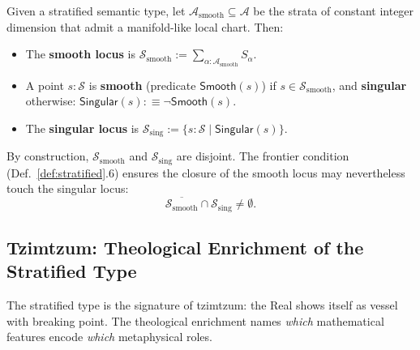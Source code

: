 \begin{definition}\label{def:smooth-sing}
Given a stratified semantic type, let $\mathcal{A}_{\mathrm{smooth}} \subseteq \mathcal{A}$ be the strata of constant integer dimension that admit a manifold-like local chart. Then:
\begin{itemize}
    \item The \textbf{smooth locus} is $\mathcal{S}_{\mathrm{smooth}} := \sum_{\alpha : \mathcal{A}_{\mathrm{smooth}}} S_\alpha$.
    \item A point $s : \mathcal{S}$ is \textbf{smooth} (predicate $\mathsf{Smooth}(s)$) if $s \in \mathcal{S}_{\mathrm{smooth}}$, and \textbf{singular} otherwise: $\mathsf{Singular}(s) :\equiv \neg \mathsf{Smooth}(s)$.
    \item The \textbf{singular locus} is $\mathcal{S}_{\mathrm{sing}} := \{ s : \mathcal{S} \mid \mathsf{Singular}(s) \}$.
\end{itemize}
By construction, $\mathcal{S}_{\mathrm{smooth}}$ and $\mathcal{S}_{\mathrm{sing}}$ are disjoint. The frontier condition (Def.~\ref{def:stratified}.6) ensures the closure of the smooth locus may nevertheless touch the singular locus:
\[
\overline{\mathcal{S}_{\mathrm{smooth}}} \cap \mathcal{S}_{\mathrm{sing}} \neq \emptyset.
\]
\end{definition}

\subsection{Tzimtzum: Theological Enrichment of the Stratified Type}

The stratified type is the signature of tzimtzum: the Real shows itself as vessel with breaking point. The theological enrichment names \emph{which} mathematical features encode \emph{which} metaphysical roles.


